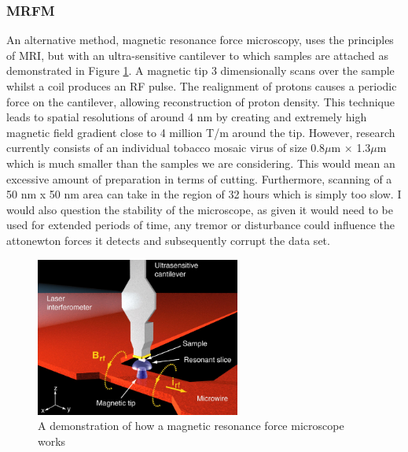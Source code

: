 \documentclass[a4paper, 11pt]{article}
\numberwithin{equation}{section}
\begin{document}
\subsubsection{MRFM}
An alternative method, magnetic resonance force microscopy, uses the principles of MRI, but with an ultra-sensitive cantilever to which samples are attached as demonstrated in Figure \ref{MRFMPic}. A magnetic tip 3 dimensionally scans over the sample whilst a coil produces an RF pulse. The realignment of protons causes a periodic force on the cantilever, allowing reconstruction of proton density. This technique leads to spatial resolutions of around 4 nm by creating and extremely high magnetic field gradient close to 4 million T/m around the tip. However, research currently consists of an individual tobacco mosaic virus of size 0.8$\mu$m $\times$ 1.3$\mu$m which is much smaller than the samples we are considering. This would mean an excessive amount of preparation in terms of cutting. Furthermore, scanning of a 50 nm x 50 nm area can take in the region of 32 hours which is simply too slow\cite{park2012semi}. I would also question the stability of the microscope, as given it would need to be used for extended periods of time, any tremor or disturbance could influence the attonewton forces it detects and subsequently corrupt the data set. 
\begin{figure}[htb!]
	\centering
	
	
	\includegraphics[width=0.6\textwidth]{MRFM.PNG}
	\caption[A demonstration of how a magnetic resonance force microscope works]{\centering \label{MRFMPic}A demonstration of how a magnetic resonance force microscope works\cite{Degen03022009}}
	
\end{figure}
\end{document}
